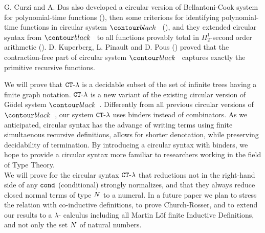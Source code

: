 G. Curzi and A. Das  also developed a circular version of Bellantoni-Cook system for 
polynomial-time functions (\cite{DBLP:conf/lics/Curzi022}), 
then some criterions for identifying polynomial-time functions
in circular system $\systemT$ (\cite{DBLP:conf/csl/Curzi023}),
and they extended circular syntax from $\systemT$ to all functions provably total in 
$\Pi^1_2$-second order arithmetic (\cite{DBLP:conf/lics/Curzi023}).
D. Kuperberg, L. Pinault and D. Pous (\cite{2021-Kuperberg-Pinault-Pous})
proved that the contraction-free part of circular system $\systemT$
captures exactly the primitive recursive functions.

%

We will prove that ${ {\tt CT}\mbox{-}\lambda}$ is a decidable subset of the set of infinite trees 
having a finite graph notation.
${ {\tt CT}\mbox{-}\lambda}$ is a new variant of the existing circular version of 
G\"{o}del system $\systemT$. Differently from all previous circular versions of 
$\systemT$, our system ${ {\tt CT}\mbox{-}\lambda}$ uses binders instead of combinators. 
As we anticipated, circular syntax has the advange of writing terms using
finite simultaenous recursive definitions, allows for shorter denotation, while preserving decidability of termination. By introducing a circular syntax with binders, 
we hope to provide a circular syntax more familiar to researchers working in the
field of Type Theory.
\\

We will prove for the circular syntax ${ {\tt CT}\mbox{-}\lambda}$
that reductions not in the right-hand side of any ${\tt cond}$ (conditional)
strongly normalizes, and that they always reduce closed normal terms of type ${N}$ to a numeral. In a future paper we plan to stress the relation with co-inductive definitions, to prove Church-Rosser, and to extend our results to a $\lambda$-
calculus including all Martin L\"{o}f finite Inductive Definitions, and not only
the set ${N}$ of natural numbers.

